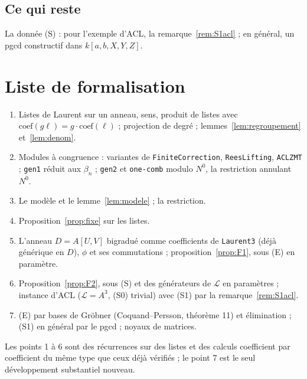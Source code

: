 \documentclass[11pt]{amsart}
\theoremstyle{remark}
\begin{document}
\subsection*{Ce qui reste}
La donnée (S) : pour l'exemple d'ACL, la remarque~\ref{rem:S1acl} ; en
général, un pgcd constructif dans $k[a,b,X,Y,Z]$.

\section{Liste de formalisation}

\begin{enumerate}
\item Listes de Laurent sur un anneau, sens, produit de listes avec
  $\text{coef}(g\ell)=g\cdot\text{coef}(\ell)$ ; projection de degré ;
  lemmes~\ref{lem:regroupement} et~\ref{lem:denom}.
\item Modules à congruence : variantes de \texttt{FiniteCorrection},
  \texttt{ReesLifting}, \texttt{ACLZMT} ; \texttt{gen1} réduit aux
  $\beta_n$ ; \texttt{gen2} et \texttt{one-comb} modulo $N^0$, la
  restriction annulant $N^0$.
\item Le modèle et le lemme~\ref{lem:modele} ; la restriction.
\item Proposition~\ref{prop:fixe} sur les listes.
\item L'anneau $D=A[U,V]$ bigradué comme coefficients de \texttt{Laurent3}
  (déjà générique en $D$), $\phi$ et ses commutations ;
  proposition~\ref{prop:F1}, sous (E) en paramètre.
\item Proposition~\ref{prop:F2}, sous (S) et des générateurs de
  $\mathcal L$ en paramètres ; instance d'ACL ($\mathcal L=A^3$, (S0)
  trivial) avec (S1) par la remarque~\ref{rem:S1acl}.
\item (E) par bases de Gröbner (Coquand--Persson, théorème 11) et
  élimination ; (S1) en général par le pgcd ; noyaux de matrices.
\end{enumerate}
Les points 1 à 6 sont des récurrences sur des listes et des calculs
coefficient par coefficient du même type que ceux déjà vérifiés ; le
point 7 est le seul développement substantiel nouveau.
\end{document}
